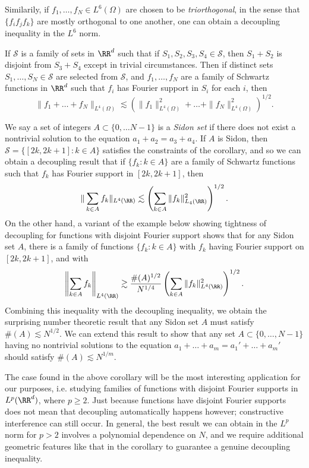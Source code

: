 \begin{remark}
  Similarily, if $f_1, \dots, f_N \in L^6(\Omega)$ are chosen to be \emph{triorthogonal}, in the sense that $\{ f_i f_j f_k \}$ are mostly orthogonal to one another, one can obtain a decoupling inequality in the $L^6$ norm.
\end{remark}

\begin{corollary}
  If $\mathcal{S}$ is a family of sets in $\RR^d$ such that if $S_1,S_2,S_3,S_4 \in \mathcal{S}$, then $S_1 + S_2$ is disjoint from $S_3 + S_4$ except in trivial circumstances. Then if distinct sets $S_1, \dots, S_N \in \mathcal{S}$ are selected from $\mathcal{S}$, and $f_1, \dots, f_N$ are a family of Schwartz functions in $\RR^d$ such that $f_i$ has Fourier support in $S_i$ for each $i$, then
  \[ \| f_1 + \dots + f_N \|_{L^4(\Omega)} \lesssim \left( \| f_1 \|_{L^4(\Omega)}^2 + \dots + \| f_N \|_{L^4(\Omega)}^2 \right)^{1/2}. \]
\end{corollary}

\begin{remark}
  We say a set of integers $A \subset \{ 0, \dots N-1 \}$ is a \emph{Sidon set} if there does not exist a nontrivial solution to the equation $a_1 + a_2 = a_3 + a_4$. If $A$ is Sidon, then $\mathcal{S} = \{ [2k,2k+1]: k \in A \}$ satisfies the constraints of the corollary, and so we can obtain a decoupling result that if $\{ f_k: k \in A \}$ are a family of Schwartz functions such that $f_k$ has Fourier support in $[2k,2k+1]$, then
  \[ \| \sum_{k \in A} f_k \|_{L^4(\RR)} \lesssim \left( \sum_{k \in A} \| f_k \|_{L_4(\RR)}^2 \right)^{1/2}. \]
  On the other hand, a variant of the example below showing tightness of decoupling for functions with disjoint Fourier support shows that for any Sidon set $A$, there is a family of functions $\{ f_k : k \in A \}$ with $f_k$ having Fourier support on $[2k,2k+1]$, and with
  \[ \left\| \sum_{k \in A} f_k \right\|_{L^4(\RR)} \gtrsim \frac{\#(A)^{1/2}}{N^{1/4}} \left( \sum_{k \in A} \| f_k \|_{L^4(\RR)}^2 \right)^{1/2}. \]
  Combining this inequality with the decoupling inequality, we obtain the surprising number theoretic result that any Sidon set $A$ must satisfy $\#(A) \lesssim N^{1/2}$. We can extend this result to show that any set $A \subset \{ 0, \dots, N-1 \}$ having no nontrivial solutions to the equation $a_1 + \dots + a_m = a_1' + \dots + a_m'$ should satisfy $\#(A) \lesssim N^{1/m}$.
\end{remark}

The case found in the above corollary will be the most interesting application for our purposes, i.e. studying families of functions with disjoint Fourier supports in $L^p(\RR^d)$, where $p \geq 2$. Just because functions have disjoint Fourier supports does not mean that decoupling automatically happens however; constructive interference can still occur. In general, the best result we can obtain in the $L^p$ norm for $p > 2$ involves a polynomial dependence on $N$, and we require additional geometric features like that in the corollary to guarantee a genuine decoupling inequality.

